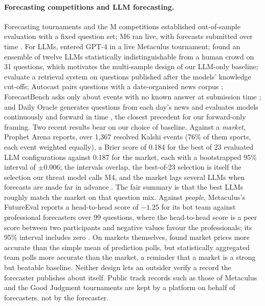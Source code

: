 \documentclass[11pt]{article}
\begin{document}
\paragraph{Forecasting competitions and LLM forecasting.} Forecasting tournaments \citep{mellers2014} and the M competitions \citep{makridakis2020m4} established out-of-sample evaluation with a fixed question set; M6 ran live, with forecasts submitted over time \citep{makridakis2025m6}. For LLMs, \citet{schoenegger2023} entered GPT-4 in a live Metaculus tournament; \citet{schoenegger2024silicon} found an ensemble of twelve LLMs statistically indistinguishable from a human crowd on 31 questions, which motivates the multi-sample design of our LLM-only baseline; \citet{halawi2024} evaluate a retrieval system on questions published after the models' knowledge cut-offs; Autocast pairs questions with a date-organised news corpus \citep{zou2022autocast}; ForecastBench asks only about events with no known answer at submission time \citep{karger2024forecastbench}; and Daily Oracle generates questions from each day's news and evaluates models continuously and forward in time \citep{dai2025prescient}, the closest precedent for our forward-only framing. Two recent results bear on our choice of baseline. Against a \emph{market}, Prophet Arena reports, over 1{,}367 resolved Kalshi events (76\% of them sports, each event weighted equally), a Brier score of 0.184 for the best of 23 evaluated LLM configurations against 0.187 for the market, each with a bootstrapped 95\% interval of $\pm 0.006$; the intervals overlap, the best-of-23 selection is itself the selection our threat model calls M4, and the market lags several LLMs when forecasts are made far in advance \citep{yang2025prophet}. The fair summary is that the best LLMs roughly match the market on that question mix. Against \emph{people}, Metaculus's FutureEval reports a head-to-head score of $-1.25$ for its bot team against professional forecasters over 99 questions, where the head-to-head score is a peer score between two participants and negative values favour the professionals; its 95\% interval includes zero \citep{metaculus2026futureeval}. On markets themselves, \citet{atanasov2017} found market prices more accurate than the simple mean of prediction polls, but statistically aggregated team polls more accurate than the market, a reminder that a market is a strong but beatable baseline. Neither design lets an outsider verify a record the forecaster publishes about itself. Public track records such as those of Metaculus and the Good Judgment tournaments \citep{mellers2014} are kept by a platform on behalf of forecasters, not by the forecaster.
\end{document}
